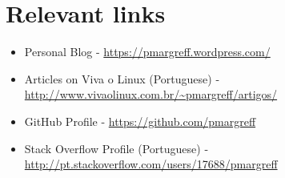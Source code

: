 \documentclass[11pt,a4paper,sans]{moderncv}        %
\begin{document}
\section{Relevant links}

\vspace{6pt}
 
\begin{itemize}

\item{Personal Blog - \href{https://pmargreff.wordpress.com/}{https://pmargreff.wordpress.com/}}

\item{Articles on Viva o Linux (Portuguese) - \href{http://www.vivaolinux.com.br/~pmargreff/artigos/}{http://www.vivaolinux.com.br/\~{}pmargreff/artigos/}}

\item{GitHub Profile - \href{https://github.com/pmargreff}{https://github.com/pmargreff}}

\item{Stack Overflow Profile (Portuguese) - \href{http://pt.stackoverflow.com/users/17688/pmargreff}{http://pt.stackoverflow.com/users/17688/pmargreff}}

\end{itemize}


\nocite{*}



\end{document}
